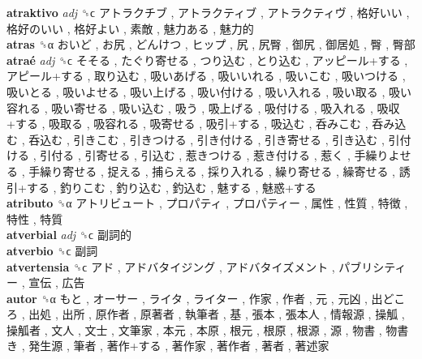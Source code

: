 \textbf{atraktivo} \emph{adj}  ␝ϲ   アトラクチブ ,  アトラクティブ ,  アトラクティヴ ,  格好いい ,  格好のいい ,  格好よい ,  素敵 ,  魅力ある ,  魅力的   \\
\textbf{atras} ␝α   おいど ,  お尻 ,  どんけつ ,  ヒップ ,  尻 ,  尻臀 ,  御尻 ,  御居処 ,  臀 ,  臀部   \\
\textbf{atraé} \emph{adj}  ␝ϲ   そそる ,  たぐり寄せる ,  つり込む ,  とり込む ,  アッピール+する ,  アピール+する ,  取り込む ,  吸いあげる ,  吸いいれる ,  吸いこむ ,  吸いつける ,  吸いとる ,  吸いよせる ,  吸い上げる ,  吸い付ける ,  吸い入れる ,  吸い取る ,  吸い容れる ,  吸い寄せる ,  吸い込む ,  吸う ,  吸上げる ,  吸付ける ,  吸入れる ,  吸収+する ,  吸取る ,  吸容れる ,  吸寄せる ,  吸引+する ,  吸込む ,  呑みこむ ,  呑み込む ,  呑込む ,  引きこむ ,  引きつける ,  引き付ける ,  引き寄せる ,  引き込む ,  引付ける ,  引付る ,  引寄せる ,  引込む ,  惹きつける ,  惹き付ける ,  惹く ,  手繰りよせる ,  手繰り寄せる ,  捉える ,  捕らえる ,  採り入れる ,  繰り寄せる ,  繰寄せる ,  誘引+する ,  釣りこむ ,  釣り込む ,  釣込む ,  魅する ,  魅惑+する   \\
\textbf{atributo} ␝α   アトリビュート ,  プロパティ ,  プロパティー ,  属性 ,  性質 ,  特徴 ,  特性 ,  特質   \\
\textbf{atverbial} \emph{adj}  ␝ϲ   副詞的   \\
\textbf{atverbio} ␝ϲ   副詞   \\
\textbf{atvertensia} ␝ϲ   アド ,  アドバタイジング ,  アドバタイズメント ,  パブリシティー ,  宣伝 ,  広告   \\
\textbf{autor} ␝α   もと ,  オーサー ,  ライタ ,  ライター ,  作家 ,  作者 ,  元 ,  元凶 ,  出どころ ,  出処 ,  出所 ,  原作者 ,  原著者 ,  執筆者 ,  基 ,  張本 ,  張本人 ,  情報源 ,  操觚 ,  操觚者 ,  文人 ,  文士 ,  文筆家 ,  本元 ,  本原 ,  根元 ,  根原 ,  根源 ,  源 ,  物書 ,  物書き ,  発生源 ,  筆者 ,  著作+する ,  著作家 ,  著作者 ,  著者 ,  著述家   \\
